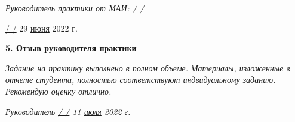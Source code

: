 {\em Руководитель практики от МАИ: \underline{\hspace{3cm} / \hspace{3cm} /}}

\vspace{20pt}

\underline{\hspace{3cm} / \hspace{3cm} /} 29 \underline{июня} 2022 г.

\vspace{10pt}

\textbf{5. Отзыв руководителя практики}

{\em Задание на практику выполнено в полном объеме. Материалы, изложенные в отчете студента, полностью соответствуют индвидуальному заданию. Рекомендую оценку отлично. }

\vspace{30pt}

{\em Руководитель \hspace{3cm} \underline{ \hspace{3cm} / \hspace{3cm} /} 11 \underline{июля} 2022 г.}
\pagebreak
